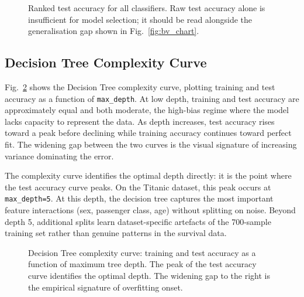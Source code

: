 \documentclass[conference]{IEEEtran}
\begin{document}
\begin{figure}[t]
    \centering
    \caption{Ranked test accuracy for all classifiers. Raw test accuracy alone is insufficient for model selection; it should be read alongside the generalisation gap shown in Fig.~\ref{fig:bv_chart}.}
    \label{fig:acc_ranking}
\end{figure}

\subsection{Decision Tree Complexity Curve}

Fig.~\ref{fig:dt_curve} shows the Decision Tree complexity curve, plotting training and test accuracy as a function of \texttt{max\_depth}. At low depth, training and test accuracy are approximately equal and both moderate, the high-bias regime where the model lacks capacity to represent the data. As depth increases, test accuracy rises toward a peak before declining while training accuracy continues toward perfect fit. The widening gap between the two curves is the visual signature of increasing variance dominating the error.

The complexity curve identifies the optimal depth directly: it is the point where the test accuracy curve peaks. On the Titanic dataset, this peak occurs at \texttt{max\_depth=5}. At this depth, the decision tree captures the most important feature interactions (sex, passenger class, age) without splitting on noise. Beyond depth 5, additional splits learn dataset-specific artefacts of the 700-sample training set rather than genuine patterns in the survival data.

\begin{figure}[t]
    \centering
    \caption{Decision Tree complexity curve: training and test accuracy as a function of maximum tree depth. The peak of the test accuracy curve identifies the optimal depth. The widening gap to the right is the empirical signature of overfitting onset.}
    \label{fig:dt_curve}
\end{figure}
\end{document}
